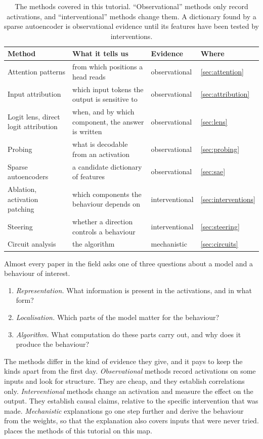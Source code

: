 \begin{table}[t]
\centering\small
\begin{tabular}{@{}>{\raggedright\arraybackslash}p{}>{\raggedright\arraybackslash}p{}p{}l@{}}
\toprule
Method & What it tells us & Evidence & Where \\
\midrule
Attention patterns & from which positions a head reads & observational & \cref{sec:attention} \\
Input attribution & which input tokens the output is sensitive to & observational & \cref{sec:attribution} \\
Logit lens, direct logit attribution & when, and by which component, the answer is written & observational & \cref{sec:lens} \\
Probing & what is decodable from an activation & observational & \cref{sec:probing} \\
Sparse autoencoders & a candidate dictionary of features & observational & \cref{sec:sae} \\
Ablation, activation patching & which components the behaviour depends on & interventional & \cref{sec:interventions} \\
Steering & whether a direction controls a behaviour & interventional & \cref{sec:steering} \\
Circuit analysis & the algorithm & mechanistic & \cref{sec:circuits} \\
\bottomrule
\end{tabular}
\caption{The methods covered in this tutorial. ``Observational'' methods only record activations, and
``interventional'' methods change them. A dictionary found by a sparse autoencoder is observational evidence
until its features have been tested by interventions.}
\label{tab:map}
\end{table}

Almost every paper in the field asks one of three questions about a model and a behaviour of interest.
\begin{enumerate}[label=\textbf{Q\arabic*.}, leftmargin=3em]
\item \emph{Representation.} What information is present in the activations, and in what form?
\item \emph{Localisation.} Which parts of the model matter for the behaviour?
\item \emph{Algorithm.} What computation do these parts carry out, and why does it produce the behaviour?
\end{enumerate}
The methods differ in the kind of evidence they give, and it pays to keep the kinds apart from the first day.
\emph{Observational} methods record activations on some inputs and look for structure. They are cheap, and they
establish correlations only. \emph{Interventional} methods change an activation and measure the effect on the
output. They establish causal claims, relative to the specific intervention that was made. \emph{Mechanistic}
explanations go one step further and derive the behaviour from the weights, so that the explanation also covers
inputs that were never tried.  places the methods of this tutorial on this map.



